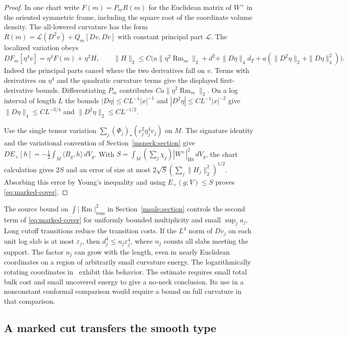 \documentclass[11pt]{article}
\numberwithin{equation}{section}
\theoremstyle{definition}
\theoremstyle{remark}
\DeclareMathOperator{\Rm}{Rm}
\begin{document}
\begin{proof}
In one chart write \(F(m)=P_m R(m)\) for the Euclidean matrix of \(W^+\)
in the oriented symmetric frame, including the square root of the
coordinate volume density. The all-lowered curvature has the form
\(R(m)=\mathcal L(D^2v)+Q_m[Dv,Dv]\) with constant principal part
\(\mathcal L\). The localized variation obeys
\[
 DF_m[\eta^4 v]=\eta^4 F(m)+\eta^2 H,\qquad
 \|H\|_2\le C\bigl(a\|\eta^2\Rm_m\|_2+d^2+
     \|D\eta\|_4d_T+
     a(\|D^2\eta\|_2+\|D\eta\|_4^2)\bigr).
\]
Indeed the principal parts cancel where the two derivatives fall
on \(v\). Terms with derivatives on \(\eta^4\) and the quadratic
curvature terms give the displayed first-derivative bounds.
Differentiating \(P_m\) contributes \(Ca\|\eta^2\Rm_m\|_2\).
On a log interval of length \(L\) the bounds
\(|D\eta|\le C L^{-1}|x|^{-1}\) and
\(|D^2\eta|\le C L^{-1}|x|^{-2}\) give
\(\|D\eta\|_4\le C L^{-3/4}\) and
\(\|D^2\eta\|_2\le C L^{-1/2}\).

Use the single tensor variation
\(\sum_j(\Phi_j)_*(c_j^2\eta_j^4 v_j)\) on \(M\).
The signature identity and the variational convention of
Section~\ref{msneck:section} give
\(DE_+[h]=-\tfrac12\int_M\langle B_g,h\rangle\,dV_g\).
With \(S=\int_M(\sum_j\chi_j)|W^+|_{\mathrm{HS}}^2\,dV_g\),
the chart calculation gives \(2S\) and an error of size at most
\(2\sqrt{S}(\sum_j\|H_j\|_2^2)^{1/2}\).
Absorbing this error by Young's inequality and using
\(E_+(g;V)\le S\) proves \eqref{eq:marked-cover}.
\end{proof}

The source bound on \(\int|\Rm|_{\mathrm{tens}}^2\) in
Section~\ref{msale:section} controls the second term of
\eqref{eq:marked-cover} for uniformly bounded multiplicity and
small \(\sup_j a_j\). Long cutoff transitions reduce the transition
costs. If the \(L^4\) norm of \(Dv_j\) on each unit log slab is at most
\(\varepsilon_j\), then \(d_j^4\le n_j\varepsilon_j^4\), where \(n_j\)
counts all slabs meeting the support. The factor \(n_j\) can grow with
the length, even in nearly Euclidean coordinates on a region of
arbitrarily small curvature energy. The logarithmically rotating
coordinates in~\cite{Baker2026DiracTransmission} exhibit this behavior.
The estimate requires small total bulk cost and small uncovered energy
to give a no-neck conclusion. Its use in a nonconstant conformal
comparison would require a bound on full curvature in that comparison.

\subsection{A marked cut transfers the smooth type}
\end{document}
